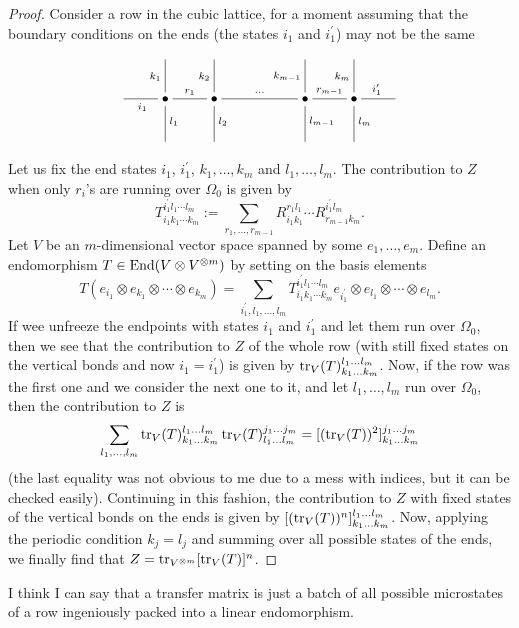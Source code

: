 \begin{proof}
Consider a row in the cubic lattice, for a moment assuming that the boundary conditions on the ends (the states $i_1$ and $i_1^\prime$) may not be the same
\[
\xymatrix{
& & & & & & \\
& \bullet \ar@{-}[l]^{i_1}\ar@{-}[u]^{k_1}\ar@{-}[d]^{l_1} \ar@{-}[r]^{r_1} & \bullet \ar@{-}[u]^{k_2}\ar@{-}[d]^{l_2} \ar@{-}[rr]^{\cdots}&  & \bullet \ar@{-}[u]^{k_{m-1}}\ar@{-}[d]^{l_{m-1}} \ar@{-}[r]^{r_{m-1}} & \bullet\ar@{-}[u]^{k_m}\ar@{-}[d]^{l_m} \ar@{-}[r]^{i_1^\prime} & \\
& & & & & &
}
\]
Let us fix the end states $i_1$, $i_1^\prime$, $k_1,\ldots,k_m$ and $l_1,\ldots,l_m$. The contribution to $Z$ when only $r_i$'s are running over $\Omega_0$ is given by
\[
T^{i_1^\prime l_1 \cdots l_m}_{i_1 k_1 \cdots k_m} := \sum_{r_1,\ldots,r_{m-1}} R_{i_1k_1}^{r_1l_1}\cdots R_{r_{m-1}k_{m}}^{i_1^\prime l_m}.
\]
Let $V$ be an $m$-dimensional vector space spanned by some $e_1,\ldots,e_m$. Define an endomorphism $T \in \operatorname{End}(V \otimes V^{\otimes m})$ by setting on the basis elements
\[
T(e_{i_1}\otimes e_{k_1} \otimes \cdots \otimes e_{k_m}) = \sum_{i_1^\prime,l_1,\ldots,l_m} T^{i_1^\prime l_1 \cdots l_m}_{i_1 k_1 \cdots k_m} e_{i_1^\prime} \otimes e_{l_1} \otimes \cdots \otimes e_{l_m}.
\]
If wee unfreeze the endpoints with states $i_1$ and $i_1^\prime$ and let them run over $\Omega_0$, then we see that the contribution to $Z$ of the whole row (with still fixed states on the vertical bonds and now $i_1 = i_1^\prime$) is given by $\operatorname{tr}_V(T)_{k_1\ldots k_m}^{l_1\ldots l_m}$. Now, if the row was the first one and we consider the next one to it, and let $l_1,\ldots,l_m$ run over $\Omega_0$, then the contribution to $Z$ is
\[
\sum_{l_1,\ldots,l_m} \operatorname{tr}_V(T)_{k_1\ldots k_m}^{l_1\ldots l_m} \operatorname{tr}_V(T)_{l_1\ldots l_m}^{j_1\ldots j_m} = [(\operatorname{tr}_V(T))^2]_{k_1\ldots k_m}^{j_1\ldots j_m}
\]
(the last equality was not obvious to me due to a mess with indices, but it can be checked easily). Continuing in this fashion, the contribution to $Z$ with fixed states of the vertical bonds on the ends is given by  $[(\operatorname{tr}_V(T))^n]_{k_1\ldots k_m}^{l_1\ldots l_m}$. Now, applying the periodic condition $k_j = l_j$ and summing over all possible states of the ends, we finally find that $Z = \operatorname{tr}_{V^{\otimes m}} [\operatorname{tr}_V(T)]^n$.
\end{proof}
I think I can say that a transfer matrix is just a batch of all possible microstates of a row ingeniously packed into a linear endomorphism.